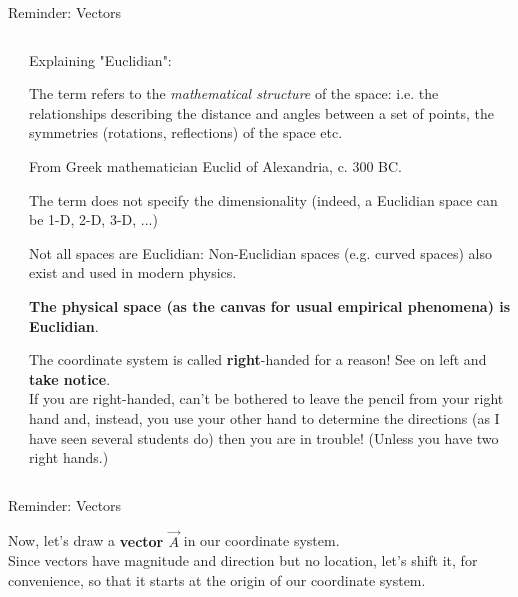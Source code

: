 {\begin{frame}{Reminder: Vectors}
\begin{columns}
\begin{column}{0.30\textwidth}
\begin{center}
   \end{center}
  \end{column}
  \begin{column}{0.70\textwidth}
  {\scriptsize
     Explaining "Euclidian":
     \begin{itemize}
     {\scriptsize
      \item
         The term refers to the {\em mathematical structure} of the space: i.e. the relationships
         describing the distance and angles between a set of points, the symmetries (rotations, reflections) of the space etc.
       \item
         From Greek mathematician Euclid of Alexandria, c. 300 BC.
       \item
         The term does not specify the dimensionality (indeed, a Euclidian space can be 1-D, 2-D, 3-D, ...)
       \item
         Not all spaces are Euclidian: Non-Euclidian spaces (e.g. curved spaces) also exist and used in modern physics.
       \item
         {\bf The physical space (as the canvas for usual empirical phenomena) is Euclidian}.
     }
     \end{itemize}
     \vspace{0.4cm}
     {\tiny
      The coordinate system is called {\bf right}-handed for a reason!
      See on left and {\bf take notice}.\\
      If you are right-handed, can't be bothered to leave the pencil from your right hand
      and, instead, you use your other hand to determine the directions
      (as I have seen several students do) then you are in trouble!
      (Unless you have two right hands.)\\
     }
  }
  \end{column}
\end{columns}

\end{frame}

%
%
%

\begin{frame}[t]{Reminder: Vectors}

{\small
 Now, let's draw a {\bf vector $\vec{A}$} in our coordinate system. \\
 \vspace{0.1cm}
 Since vectors have magnitude and direction
 but no location, let's shift it, for convenience, so that it starts at the origin of our coordinate system.
}
\vspace{0.1cm}


\end{frame}}
